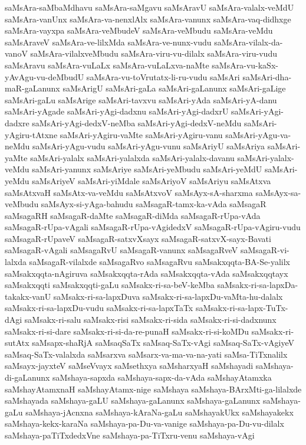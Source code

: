 {saMsAra-saMbaMdhavu
saMsAra-saMgavu
saMsAravU
saMsAra-valalx-veMdU
saMsAra-vanUnx
saMsAra-va-nenxlAlx
saMsAra-vanunx
saMsAra-vaq-didhxge
saMsAra-vayxpa
saMsAra-veMbudeV
saMsAra-veMbudu
saMsAra-veMdu
saMsAraveV
saMsAra-ve-lilxMda
saMsAra-ve-nunx-vudu
saMsAra-vilalx-da-vanoV
saMsAra-vilalxveMbudu
saMsAra-viru-vu-dilalx
saMsAra-viru-vudu
saMsAravu
saMsAra-vuLaLx
saMsAra-vuLaLxva-naMte
saMsAra-vu-kaSx-yAvAgu-vu-deMbudU
saMsAra-vu-toVrutatx-li-ru-vudu
saMsAri
saMsAri-dha-maR-gaLanunx
saMsArigU
saMsAri-gaLa
saMsAri-gaLanunx
saMsAri-gaLige
saMsAri-gaLu
saMsArige
saMsAri-tavxvu
saMsAri-yAda
saMsAri-yA-danu
saMsAri-yAgade
saMsAri-yAgi-dadxnu
saMsAri-yAgi-dadxrU
saMsAri-yAgi-dadxre
saMsAri-yAgi-dedxV-neMba
saMsAri-yAgi-dedxV-neMdu
saMsAri-yAgiru-tAtxne
saMsAri-yAgiru-vaMte
saMsAri-yAgiru-vanu
saMsAri-yAgu-va-neMdu
saMsAri-yAgu-vudu
saMsAri-yAgu-vunu
saMsAriyU
saMsAriya
saMsAri-yaMte
saMsAri-yalalx
saMsAri-yalalxda
saMsAri-yalalx-davanu
saMsAri-yalalx-veMdu
saMsAri-yanunx
saMsAriye
saMsAri-yeMbudu
saMsAri-yeMdU
saMsAri-yeMdu
saMsAriyeV
saMsAri-yiMdale
saMsAriyoV
saMsAriyu
saMsAtxva
saMsAtxvaH
saMsAtx-va-veMdu
saMsAtxvoV
saMsAyx-sA-sharxma
saMsAyx-sa-veMbudu
saMsAyx-si-yAga-bahudu
saMsagaR-tamx-ka-vAda
saMsagaR
saMsagaRH
saMsagaR-daMte
saMsagaR-diMda
saMsagaR-rUpa-vAda
saMsagaR-rUpa-vAgali
saMsagaR-rUpa-vAgidedxV
saMsagaR-rUpa-vAgiru-vudu
saMsagaR-rUpaveV
saMsagaR-satxvXsayx
saMsagaR-satxvX-sayx-Bavati
saMsagaR-vAgali
saMsagaRvU
saMsagaR-vanunx
saMsagaRveV
saMsagaR-vi-lalxda
saMsagaR-vilalxde
saMsagaRvo
saMsagaRvu
saMsakxqqta-BA-Se-yalilx
saMsakxqqta-nAgiruva
saMsakxqqta-rAda
saMsakxqqta-vAda
saMsakxqqtayx
saMsakxqqti
saMsakxqqti-gaLu
saMsakx-ri-sa-beV-keMba
saMsakx-ri-sa-lapxDa-takakx-vanU
saMsakx-ri-sa-lapxDuva
saMsakx-ri-sa-lapxDu-vaMta-hu-dalalx
saMsakx-ri-sa-lapxDu-vudu
saMsakx-ri-sa-lapxTaTx
saMsakx-ri-sa-lapx-TuTx-dAgi
saMsakx-ri-salu
saMsakx-risi
saMsakx-ri-sida
saMsakx-ri-si-dadxnunx
saMsakx-ri-si-dare
saMsakx-ri-si-da-re-punaH
saMsakx-ri-si-koMDu
saMsakx-ri-sutAtx
saMsapx-shaRjA
saMsaqSaTx
saMsaq-SaTx-vAgi
saMsaq-SaTx-vAgiyeV
saMsaq-SaTx-valalxda
saMsarxva
saMsarx-va-ma-va-na-yati
saMsa-TiTxnalilx
saMsayx-jayxteV
saMseVvayx
saMsethxya
saMsharxyaH
saMshayadi
saMshaya-di-gaLanunx
saMshaya-sapxda
saMshaya-sapx-da-vAda
saMshayAtamxka
saMshayAtamxnaH
saMshayAtamx-nige
saMshaya
saMshaya-BArxMti-ga-lilalxde
saMshayada
saMshaya-gaLU
saMshaya-gaLanunx
saMshaya-gaLanunx
saMshaya-gaLu
saMshaya-jAcnxna
saMshaya-kAraNa-gaLu
saMshayakUkx
saMshayakekx
saMshaya-kekx-karaNa
saMshaya-pa-Du-va-vanige
saMshaya-pa-Du-vu-dilalx
saMshaya-paTiTxdedxVne
saMshaya-pa-TiTxru-venu
saMshaya-vAgi
}
